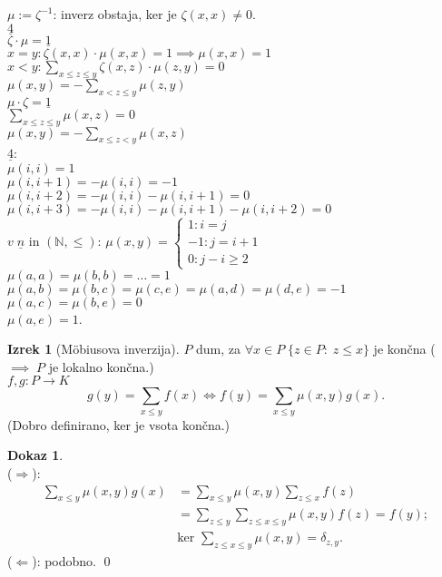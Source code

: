 \documentclass[a4paper, 12pt]{book}
\theoremstyle{definition}
\newtheorem{theorem}[counter]{Izrek}
\newtheorem{pro}[counter]{Dokaz}
\theoremstyle{remark}
\newcommand{\N}{\mathbb{N}}
\begin{document}
$\mu := \zeta^{-1}$: inverz obstaja, ker je $\zeta(x,x) \neq 0$. \\
$\underline{4}$ \\
$\zeta \cdot \mu = \underline{1}$ \\
$x = y: \zeta(x,x) \cdot \mu(x,x) = 1 \implies \mu(x,x) = 1$ \\
$x < y: \sum_{x \leq z \leq y} \zeta(x,z) \cdot \mu(z, y) = 0$ \\
$\mu(x,y) = -\sum_{x < z \leq y} \mu(z, y)$ \\
$\mu \cdot \zeta = \underline{1}$ \\
$\sum_{x \leq z \leq y} \mu(x, z) = 0$ \\
$\mu(x,y) = -\sum_{x \leq z < y} \mu(x, z)$ \\
$\underline{4}$: \\
$\mu(i, i) = 1$ \\
$\mu(i, i+1) = -\mu(i, i) = -1$ \\
$\mu(i, i+2) = -\mu(i, i) - \mu(i, i+1) = 0$ \\
$\mu(i, i+3) = -\mu(i, i) - \mu(i, i+1) - \mu(i, i+2) = 0$ \\
$v \; \underline{n}$ in $(\N, \leq)$:
$\mu(x,y) = \begin{cases}
  1: i = j \\
  -1: j = i + 1 \\
  0: j - i \geq 2
\end{cases}$ \\
$\mu(a, a) = \mu(b, b ) = \dots = 1$ \\
$\mu(a, b) = \mu(b, c) = \mu(c, e) = \mu(a, d) = \mu(d, e) = -1$ \\
$\mu(a, c) = \mu(b, e) = 0$ \\
$\mu(a, e) = 1$.
\begin{theorem}[Möbiusova inverzija]
  $P$ dum, za $\forall x \in P \; \{z \in P: \; z \leq x\}$ je končna ($\implies \; P$ je lokalno končna.) \\
  $f, g: P \to K$ \\
  \begin{equation*}
    g(y) = \sum_{x \leq y} f(x) \iff f(y) = \sum_{x \leq y} \mu(x, y) g(x).
  \end{equation*}
  (Dobro definirano, ker je vsota končna.)
\end{theorem}
\begin{pro} \text{} \\
  ($\Rightarrow$):
  \begin{align*}
    \sum_{x \leq y} \mu(x, y) g(x) &= \sum_{x \leq y} \mu(x, y) \sum_{z \leq x} f(z) \\
    &= \sum_{z \leq y} \sum_{z \leq x \leq y} \mu(x, y) f(z) = f(y); \\
    &\text{ker } \sum_{z \leq x \leq y} \mu(x, y) = \delta_{z, y}.
  \end{align*}
  ($\Leftarrow$): podobno.
  \qed
\end{pro}
\end{document}

